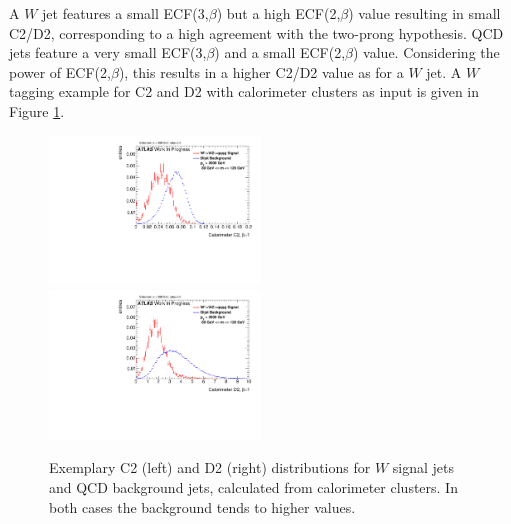 A $W$ jet features a small ECF(3,$\beta$) but a high ECF(2,$\beta$) value resulting in small C2/D2, corresponding to a high agreement with the two-prong hypothesis. QCD jets feature a very small ECF(3,$\beta$) and a small ECF(2,$\beta$) value. Considering the power of ECF(2,$\beta$), this results in a higher C2/D2 value as for a $W$ jet. A $W$ tagging example for C2 and D2 with calorimeter clusters as input is given in Figure \ref{fig:ECF_example}.
\begin{figure}
\includegraphics[width=0.5\textwidth]{sascha_input/plots/W/Beta1/h_recoJet_C2_bin6.pdf} \hspace{1mm}
\includegraphics[width=0.5\textwidth]{sascha_input/plots/W/Beta1/h_recoJet_D2_bin6.pdf} 
\caption{Exemplary C2 (left) and D2 (right) distributions for $W$ signal jets and QCD background jets, calculated from calorimeter clusters. In both cases the background tends to higher values.}\label{fig:ECF_example}
\end{figure}
